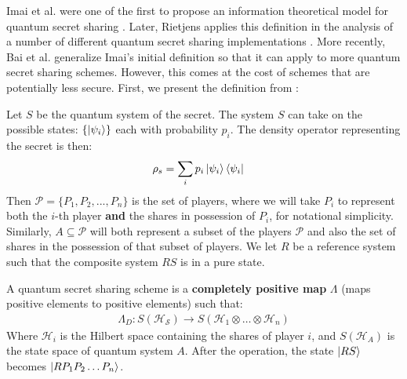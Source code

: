 Imai et al. were one of the first to propose an information theoretical model for quantum secret sharing \cite{imai_quantum_2003}. Later, Rietjens applies this definition in the analysis of a number of different quantum secret sharing implementations \cite{rietjens_quantum_2005}. More recently, Bai et al. generalize Imai's initial definition so that it can apply to more quantum secret sharing schemes. However, this comes at the cost of schemes that are potentially less secure. First, we present the definition from \cite{imai_quantum_2003}:

Let $S$ be the quantum system of the secret. The system $S$ can take on the possible states: $\{\ket{\psi_i}\}$ each with probability $p_i$. The density operator representing the secret is then:
\begin{align}
    \rho_s &= \sum_i p_i \ket{\psi_i} \bra{\psi_i}
\end{align}
Then $\mathcal{P} = \{P_1,P_2,...,P_n\}$ is the set of players, where we will take $P_i$ to represent both the $i$-th player \textbf{and} the shares in possession of $P_i$, for notational simplicity. Similarly, $A \subseteq \mathcal{P}$ will both represent a subset of the players $\mathcal{P}$ and also the set of shares in the possession of that subset of players. We let $R$ be a reference system such that the composite system $RS$ is in a pure state.

A quantum secret sharing scheme is a \textbf{completely positive map} $\Lambda$ (maps positive elements to positive elements) such that:
\begin{align}
    \Lambda_D: S(\mathcal{H_S}) \to S(\mathcal{H}_1 \otimes \dots \otimes \mathcal{H}_n)
\end{align}
Where $\mathcal{H}_i$ is the Hilbert space containing the shares of player $i$, and $S(\mathcal{H}_A)$ is the state space of quantum system $A$. After the operation, the state $\ket{RS}$ becomes $\ket{RP_1P_2 \dots P_n}$.

